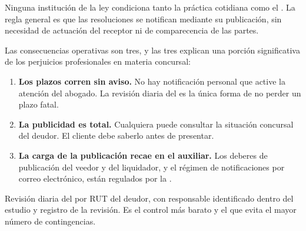 Ninguna institución de la ley condiciona tanto la práctica cotidiana como el
\boletin{}. La regla general es que las resoluciones se notifican mediante su
publicación, sin necesidad de actuación del receptor ni de comparecencia de las partes.

Las consecuencias operativas son tres, y las tres explican una porción significativa de
los perjuicios profesionales en materia concursal:

\begin{enumerate}
  \item \textbf{Los plazos corren sin aviso.} No hay notificación personal que active la
  atención del abogado. La revisión diaria del \boletin{} es la única forma de no perder
  un plazo fatal.

  \item \textbf{La publicidad es total.} Cualquiera puede consultar la situación
  concursal del deudor. El cliente debe saberlo antes de presentar.

  \item \textbf{La carga de la publicación recae en el auxiliar.} Los deberes de
  publicación del veedor y del liquidador, y el régimen de notificaciones por correo
  electrónico, están regulados por la  \citeyearpar{ncg-14}.
\end{enumerate}

\begin{foco}
Revisión diaria del \boletin{} por RUT del deudor, con responsable identificado dentro del
estudio y registro de la revisión. Es el control más barato y el que evita el mayor
número de contingencias.
\end{foco}
